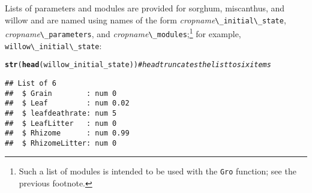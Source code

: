 \documentclass{article}\usepackage[]{graphicx}\usepackage[]{color}
\makeatletter
\newcommand{\hlcom}[1]{\textcolor[rgb]{0.678,0.584,0.686}{\textit{#1}}}%
\newcommand{\hlstd}[1]{\textcolor[rgb]{0.345,0.345,0.345}{#1}}%
\newcommand{\hlkwd}[1]{\textcolor[rgb]{0.737,0.353,0.396}{\textbf{#1}}}%
\newenvironment{kframe}{%
 \def\at@end@of@kframe{}%
 \ifinner\ifhmode%
  \def\at@end@of@kframe{\end{minipage}}%
  \begin{minipage}{\columnwidth}%
 \fi\fi%
 \def\FrameCommand##1{\hskip\@totalleftmargin \hskip-\fboxsep
 \colorbox{shadecolor}{##1}\hskip-\fboxsep
     \hskip-\linewidth \hskip-\@totalleftmargin \hskip\columnwidth}%
 \MakeFramed {\advance\hsize-\width
   \@totalleftmargin\z@ \linewidth\hsize
   \@setminipage}}%
 {\par\unskip\endMakeFramed%
 \at@end@of@kframe}
\newenvironment{knitrout}{}{} %
\newcommand{\code}[1]{\lstinline[style=C++style]{#1}}
\makeatother
\begin{document}
Lists of parameters and modules are provided for sorghum, miscanthus,
and willow and are named using names of the form
\emph{cropname}\code{\_initial\_state},
\emph{cropname}\code{\_parameters}, and
\emph{cropname}\code{\_modules};\footnote{Such a list of modules is
  intended to be used with the \code{Gro} function; see the previous
  footnote.} for example, \code{willow\_initial\_state}:

\begin{knitrout}
\color{fgcolor}\begin{kframe}
\begin{alltt}
\hlkwd{str}\hlstd{(}\hlkwd{head}\hlstd{(willow_initial_state))} \hlcom{# head truncates the list to six items}
\end{alltt}
\begin{verbatim}
## List of 6
##  $ Grain        : num 0
##  $ Leaf         : num 0.02
##  $ leafdeathrate: num 5
##  $ LeafLitter   : num 0
##  $ Rhizome      : num 0.99
##  $ RhizomeLitter: num 0
\end{verbatim}
\end{kframe}
\end{knitrout}
\end{document}

